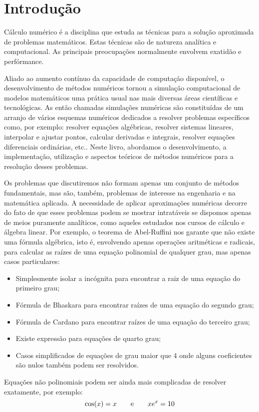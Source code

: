 \documentclass[main.tex]{subfiles}
\begin{document}
\chapter{Introdução}

Cálculo numérico é a disciplina que estuda as técnicas para a solução aproximada de problemas matemáticos. Estas técnicas são de natureza analítica e computacional. As principais preocupações normalmente envolvem exatidão e perfórmance. 

Aliado ao aumento contínuo da capacidade de computação disponível, o desenvolvimento de métodos numéricos tornou a simulação computacional de modelos matemáticos uma prática usual nas mais diversas áreas científicas e tecnológicas. As então chamadas simulações numéricas são constituídas de um arranjo de vários esquemas numéricos dedicados a resolver problemas específicos como, por exemplo: resolver equações algébricas, resolver sistemas lineares, interpolar e ajustar pontos, calcular derivadas e integrais, resolver equações diferenciais ordinárias, etc.. Neste livro, abordamos o desenvolvimento, a implementação, utilização e aspectos teóricos de métodos numéricos para a resolução desses problemas.

Os problemas que discutiremos não formam apenas um conjunto de métodos fundamentais, mas são, também, problemas de interesse na engenharia e na matemática aplicada. A necessidade de aplicar aproximações numéricas decorre do fato de que esses problemas podem se mostrar intratáveis se dispomos apenas de meios puramente analíticos, como aqueles estudados nos cursos de cálculo e álgebra linear. Por exemplo, o teorema de Abel-Ruffini nos garante que não existe uma fórmula algébrica, isto é, envolvendo apenas operações aritméticas e radicais, para calcular as raízes de uma equação polinomial de qualquer grau, mas apenas casos particulares:
\begin{itemize}
\item Simplesmente isolar a incógnita para encontrar a raiz de uma equação do primeiro grau;
\item Fórmula de Bhaskara para encontrar raízes de uma equação do segundo grau;
\item Fórmula de Cardano para encontrar raízes de uma equação do terceiro grau;
\item Existe expressão para equações de quarto grau;
\item Casos simplificados de equações de grau maior que 4 onde alguns coeficientes são nulos também podem ser resolvidos.
\end{itemize}
Equações não polinomiais podem ser ainda mais complicadas de resolver exatamente, por exemplo:
$$
\cos(x)=x\qquad \hbox{e}\qquad xe^x= 10
$$
\end{document}
